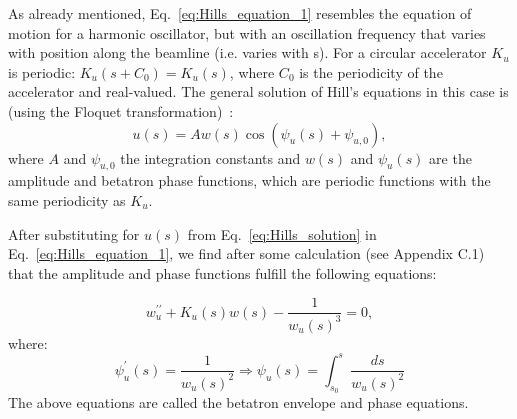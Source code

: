 
As already mentioned, Eq.~\eqref{eq:Hills_equation_1} resembles the equation of motion for a harmonic oscillator, but with an oscillation frequency that varies with position along the beamline (i.e. varies with s). For a circular accelerator $K_u$ is periodic: $K_u(s+C_0)=K_u(s)$, where $C_0$ is the periodicity of the accelerator and real-valued. The general solution of Hill's equations in this case is (using the Floquet transformation)~\cite{Lee:1425444}:
\begin{equation}\label{eq:Hills_solution}
    u(s) = A w(s) \cos{(\psi_u(s)+\psi_{u,0})},
\end{equation} %
where $A$ and $\psi_{u,0}$ the integration constants and $w(s)$ and $\psi_u(s)$ are the amplitude and betatron phase functions, which are periodic functions with the same periodicity as $K_u$.

After substituting for $u(s)$ from Eq.~\eqref{eq:Hills_solution} in Eq.~\eqref{eq:Hills_equation_1}, we find after some calculation (see Appendix C.1) that the amplitude and phase functions fulfill the following equations: 

\begin{equation}\label{eq:phase_functions}
    w^{\prime \prime}_u + K_u(s) w(s) -\frac{1}{w_u(s)^3} = 0, 
\end{equation}
where:
\begin{equation}\label{eq:phase_function}
    \psi^{\prime}_u(s) = \frac{1}{w_u(s)^2} \Rightarrow \psi_u(s) = \int_{s_0}^{s} \frac{ds}{w_u(s)^2}
\end{equation}
The above equations are called the betatron envelope and phase equations.

